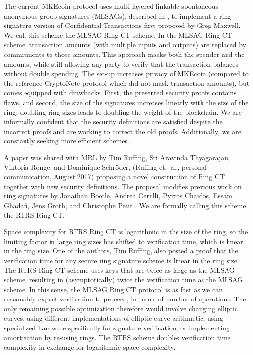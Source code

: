 \documentclass[12pt,english]{mrl}
\theoremstyle{definition}
\numberwithin{equation}{section}
\numberwithin{figure}{section}
\numberwithin{equation}{section}
\numberwithin{equation}{section}
\numberwithin{figure}{section}
\begin{document}
The current MKEcoin protocol uses multi-layered linkable spontaneous anonymous group signatures (MLSAGs), described in \cite{noether2016ring}, to implement a ring signature version of Confidential Transactions first proposed by Greg Maxwell. We call this scheme the MLSAG Ring CT scheme. In the MLSAG Ring CT scheme, transaction amounts (with multiple inputs and outputs) are replaced by commitments to those amounts. This approach masks both the spender and the amounts, while still allowing any party to verify that the transaction balances without double spending. The set-up increases privacy of MKEcoin (compared to the reference CryptoNote protocol which did not mask transaction amounts), but comes equipped with drawbacks. First, the presented security proofs contains flaws, and second, the size of the signatures increases linearly with the size of the ring: doubling ring sizes leads to doubling the weight of the blockchain.  We are informally confident that the security definitions are satisfied despite the incorrect proofs and are working to correct the old proofs. Additionally, we are constantly seeking more efficient schemes.

A paper was shared with MRL by Tim Ruffing, Sri Aravinda Thyagarajan, Viktoria Ronge, and Dominique Schr{\"o}der, (Ruffing et.\ al., personal communication, August 2017) proposing a novel construction of Ring CT together with new security definitions. The proposal modifies previous work on ring signatures by Jonathan Bootle, Andrea Cerulli, Pyrros Chaidos, Essam Ghadafi, Jens Groth, and Christophe Petit \cite{bootle2015short}. We are formally calling this scheme the RTRS Ring CT.  

Space complexity for RTRS Ring CT is logarithmic in the size of the ring, so the limiting factor in large ring sizes has shifted to verification time, which is linear in the ring size. One of the authors, Tim Ruffing, also posted a proof that the verification time for any secure ring signature scheme is linear in the ring size. The RTRS Ring CT scheme uses keys that are twice as large as the MLSAG scheme, resulting in (asymptotically) twice the verification time as the MLSAG scheme. In this sense, the MLSAG Ring CT protocol is as fast as we can reasonably expect verification to proceed, in terms of number of operations. The only remaining possible optimization therefore would involve changing elliptic curves, using different implementations of elliptic curve arithmetic, using specialized hardware specifically for signature verification, or implementing amortization by re-using rings. The RTRS scheme doubles verification time complexity in exchange for logarithmic space complexity.
\end{document}
